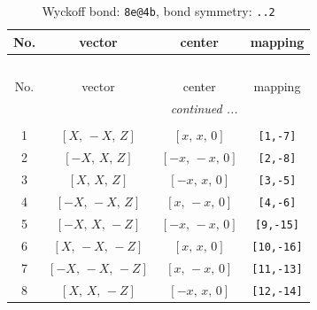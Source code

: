\documentclass[fleqn,8pt]{jsarticle}
\begin{document}
\begin{longtable}{cccc}
\caption{Wyckoff bond: {\tt 8e@4b}, bond symmetry: {\tt ..2}}
 \\
 \hline \hline
No. & vector & center & mapping \\ \hline \endfirsthead

\multicolumn{3}{l}{\tablename\ \thetable{}} \\
 \hline \hline
No. & vector & center & mapping \\ \hline \endhead

 \hline \hline
\multicolumn{3}{r}{\footnotesize\it continued ...} \\ \endfoot

 \hline \hline
\multicolumn{3}{r}{} \\ \endlastfoot

1 & $\left[ X,\, - X,\, Z \right]$ & $\left[ x,\, x,\, 0 \right]$ & {\tt [1,-7]} \\ \hline
2 & $\left[ - X,\, X,\, Z \right]$ & $\left[ - x,\, - x,\, 0 \right]$ & {\tt [2,-8]} \\ \hline
3 & $\left[ X,\, X,\, Z \right]$ & $\left[ - x,\, x,\, 0 \right]$ & {\tt [3,-5]} \\ \hline
4 & $\left[ - X,\, - X,\, Z \right]$ & $\left[ x,\, - x,\, 0 \right]$ & {\tt [4,-6]} \\ \hline
5 & $\left[ - X,\, X,\, - Z \right]$ & $\left[ - x,\, - x,\, 0 \right]$ & {\tt [9,-15]} \\ \hline
6 & $\left[ X,\, - X,\, - Z \right]$ & $\left[ x,\, x,\, 0 \right]$ & {\tt [10,-16]} \\ \hline
7 & $\left[ - X,\, - X,\, - Z \right]$ & $\left[ x,\, - x,\, 0 \right]$ & {\tt [11,-13]} \\ \hline
8 & $\left[ X,\, X,\, - Z \right]$ & $\left[ - x,\, x,\, 0 \right]$ & {\tt [12,-14]} \\
\end{longtable}
\renewcommand{\arraystretch}{1.2}
\end{document}
